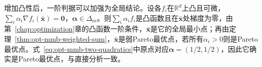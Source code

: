 增加凸性后，一阶判据可以加强为全局结论。设各$f_i$在$\mathbb R^d$上凸且可微，$\sum_i\alpha_i\nabla f_i(\bar{\bm x})=\bm 0$，$\bm\alpha\in\Delta_m$。则$\sum_i\alpha_if_i$是凸函数且在$\bar{\bm x}$处梯度为零，由第~\ref{chap:optimization}章的凸函数一阶条件，$\bar{\bm x}$是它的全局最小点；再由定理~\ref{thm:opt-mmb-weighted-sum}，$\bar{\bm x}$是弱Pareto最优点，若所有$\alpha_i>0$则是Pareto最优点。式~\eqref{eq:opt-mmb-two-quadratics}中原点对应$\bm\alpha=(1/2,1/2)$，因此它确实是Pareto最优点，与直接分析一致。
